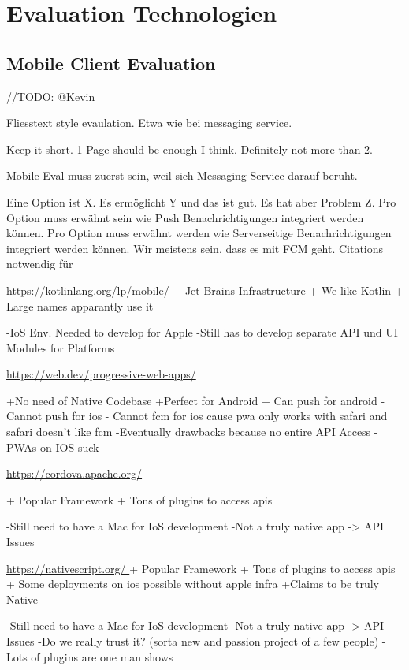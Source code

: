 \section{Evaluation Technologien}\label{sec:evaluation-technologien}

\subsection{Mobile Client Evaluation}\label{subsec:mobile-client-eval}

//TODO: @Kevin

Fliesstext style evaulation. Etwa wie bei messaging service.

Keep it short.
1 Page should be enough I think.
Definitely not more than 2.

Mobile Eval muss zuerst sein, weil sich Messaging Service darauf beruht.

Eine Option ist X. Es ermöglicht Y und das ist gut. Es hat aber Problem Z.
Pro Option muss erwähnt sein wie Push Benachrichtigungen integriert werden können.
Pro Option muss erwähnt werden wie Serverseitige Benachrichtigungen integriert werden können.
Wir meistens sein, dass es mit FCM geht.
Citations notwendig für

\url{https://kotlinlang.org/lp/mobile/}
    + Jet Brains Infrastructure
    + We like Kotlin
    + Large names apparantly use it

    -IoS Env. Needed to develop for Apple 
    -Still has to develop separate API und UI Modules for Platforms 

\url{https://web.dev/progressive-web-apps/ }
	
    +No need of Native Codebase
    +Perfect for Android
    + Can push for android
    - Cannot push for ios
    - Cannot fcm for ios cause pwa only works with safari and safari doesn't like fcm
    -Eventually drawbacks because no entire API Access 
    -PWAs on IOS suck

\url{https://cordova.apache.org/} 

    + Popular Framework
    + Tons of plugins to access apis

    -Still need to have a Mac for IoS development  
    -Not a truly native app -> API Issues
 

\url{https://nativescript.org/ }
    + Popular Framework
    + Tons of plugins to access apis
    + Some deployments on ios possible without apple infra
    +Claims to be truly Native

    -Still need to have a Mac for IoS development
    -Not a truly native app -> API Issues
    -Do we really trust it? (sorta new and passion project of a few people)
    - Lots of plugins are one man shows

